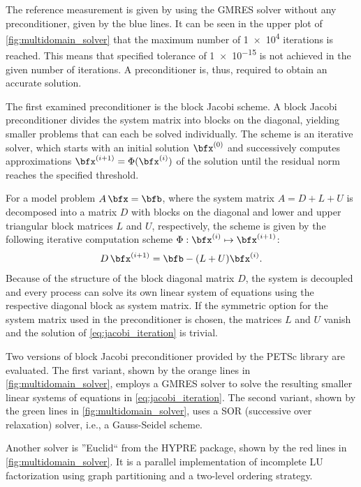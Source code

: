 The reference measurement is given by using the GMRES solver without any preconditioner, given by the blue lines.
It can be seen in the upper plot of \cref{fig:multidomain_solver} that the maximum number of \num{1e4} iterations is reached. This means that specified tolerance of \num{1e-15} is not achieved in the given number of iterations. A preconditioner is, thus, required to obtain an accurate solution.

The first examined preconditioner is the block Jacobi scheme.
A block Jacobi preconditioner divides the system matrix into blocks on the diagonal, yielding smaller problems that can each be solved individually.
The scheme is an iterative solver, which starts with an initial solution $\bfx^{(0)}$ and successively computes  approximations $\bfx^{(i+1)} = \Phi(\bfx^{(i)})$ of the solution until the residual norm reaches the specified threshold.

For a model problem $A\,\bfx = \bfb$, where the system matrix $A=D+L+U$ is decomposed into a matrix $D$ with blocks on the diagonal and lower and upper triangular block matrices $L$ and $U$, respectively, the scheme is given by the following iterative computation scheme $\Phi: \bfx^{(i)} \mapsto \bfx^{(i+1)}$:
\begin{align}\label{eq:jacobi_iteration}
  D\,\bfx^{(i+1)} = \bfb - (L+U)\bfx^{(i)}.
\end{align}
Because of the structure of the block diagonal matrix $D$, the system is decoupled and every process can solve its own linear system of equations using the respective diagonal block as system matrix. If the symmetric option for the system matrix used in the preconditioner is chosen, the matrices $L$ and $U$ vanish and the solution of \cref{eq:jacobi_iteration} is trivial.

Two versions of block Jacobi preconditioner provided by the PETSc library are evaluated.
The first variant, shown by the orange lines in \cref{fig:multidomain_solver}, employs a GMRES solver to solve the resulting smaller linear systems of equations in \cref{eq:jacobi_iteration}.
The second variant, shown by the green lines in \cref{fig:multidomain_solver}, uses a SOR (successive over relaxation) solver, i.e., a Gauss-Seidel scheme.

Another solver is ''Euclid`` \cite{euclid} from the HYPRE package, shown by the red lines in \cref{fig:multidomain_solver}. It is a parallel implementation of incomplete LU factorization using graph partitioning and a two-level ordering strategy.

